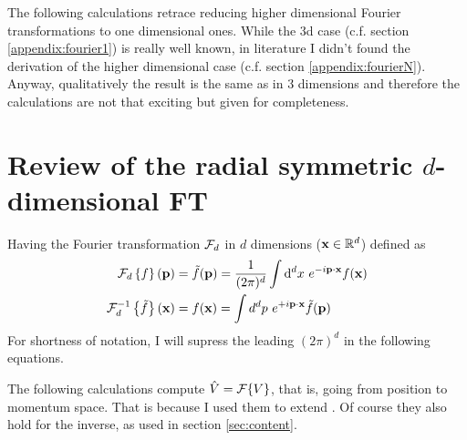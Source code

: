 \documentclass[10pt,a4paper]{article}
\begin{document}
\newpage
\begin{appendices}
The following calculations retrace reducing higher dimensional Fourier transformations to one dimensional ones. While the 3d case (c.f. section \ref{appendix:fourier1}) is really well known, in literature I didn't found the derivation of the higher dimensional case (c.f. section \ref{appendix:fourierN}). Anyway, qualitatively the result is the same as in 3 dimensions and therefore the calculations are not that exciting but given for completeness.

\section{Review of the radial symmetric $d$-dimensional FT} \label{appendix:fourier}
Having the Fourier transformation ${\cal F}_d$ in $d$ dimensions ($\mathbf{ x } \in \mathbb R^d$) defined as
%
\begin{subequations}
\begin{align}
{\cal F}_d\left\{ f \right\}(\mathbf{ p }) &= \tilde f(\mathbf{ p }) = \frac 1{(2\pi)^d} \int \mathrm{d}^d x~e^{-i\mathbf{ p } \cdot \mathbf{ x }} f(\mathbf{ x }) \label{eq:Four1} \\
{\cal F}^{-1}_d\left\{ \tilde f \right\}(\mathbf{ x }) &= f(\mathbf{ x }) =   \int d^d p~e^{+i \mathbf{ p } \cdot \mathbf{ x }} \tilde f(\mathbf{ p }) \label{eq:Four2}
\end{align}
\end{subequations}
%
For shortness of notation, I will supress the leading $(2\pi)^d$ in the following equations.

The following calculations compute $\hat V = {\cal F}\{V\}$, that is, going from position to momentum space. That is because I used them to extend \cite{NS2012}. Of course they also hold for the inverse, as used in section \ref{sec:content}.


\end{appendices}
\end{document}
